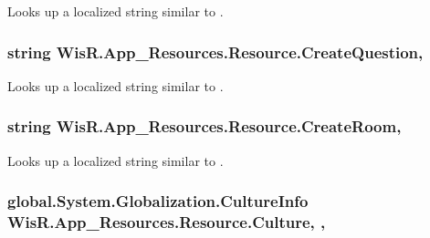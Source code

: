 Looks up a localized string similar to . 

\hypertarget{class_wis_r_1_1_app___resources_1_1_resource_acf86c9f9699b39109fb929784db9e81a}{}
\subsubsection[{Create\+Question}]{\setlength{\rightskip}{0pt plus 5cm}string Wis\+R.\+App\+\_\+\+Resources.\+Resource.\+Create\+Question\hspace{0.3cm}{\ttfamily [static]}, {\ttfamily [get]}}\label{class_wis_r_1_1_app___resources_1_1_resource_acf86c9f9699b39109fb929784db9e81a}


Looks up a localized string similar to . 

\hypertarget{class_wis_r_1_1_app___resources_1_1_resource_ab7dfe17c21508157cebba3ff3fba4b4c}{}
\subsubsection[{Create\+Room}]{\setlength{\rightskip}{0pt plus 5cm}string Wis\+R.\+App\+\_\+\+Resources.\+Resource.\+Create\+Room\hspace{0.3cm}{\ttfamily [static]}, {\ttfamily [get]}}\label{class_wis_r_1_1_app___resources_1_1_resource_ab7dfe17c21508157cebba3ff3fba4b4c}


Looks up a localized string similar to . 

\hypertarget{class_wis_r_1_1_app___resources_1_1_resource_a9dad9904a0dcd39d6d305055f2952433}{}
\subsubsection[{Culture}]{\setlength{\rightskip}{0pt plus 5cm}global.\+System.\+Globalization.\+Culture\+Info Wis\+R.\+App\+\_\+\+Resources.\+Resource.\+Culture\hspace{0.3cm}{\ttfamily [static]}, {\ttfamily [get]}, {\ttfamily [set]}}\label{class_wis_r_1_1_app___resources_1_1_resource_a9dad9904a0dcd39d6d305055f2952433}


